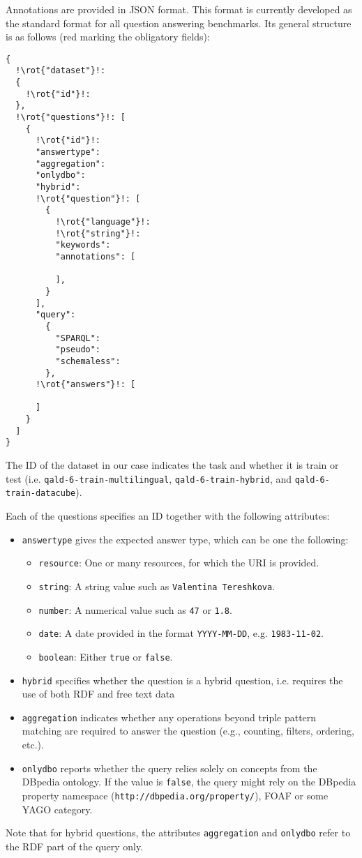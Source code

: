 
Annotations are provided in JSON format. This format is currently developed as the standard format for all question answering benchmarks.
Its general structure is as follows (red marking the obligatory fields):

\begin{lstlisting}[escapechar=!]
{
  !\rot{"dataset"}!:
  {
    !\rot{"id"}!:
  },
  !\rot{"questions"}!: [
    {
      !\rot{"id"}!:
      "answertype":
      "aggregation":
      "onlydbo":
      "hybrid":
      !\rot{"question"}!: [
        {
          !\rot{"language"}!:
          !\rot{"string"}!:
          "keywords":
          "annotations": [

          ],
        }
      ],
      "query":
        {
          "SPARQL":
          "pseudo":
          "schemaless":
        },
      !\rot{"answers"}!: [

      ]
    }
  ]
}
\end{lstlisting}

The ID of the dataset in our case indicates the task and whether it is train or test (i.e. {\tt qald-6-train-multilingual}, {\tt qald-6-train-hybrid}, and {\tt qald-6-train-datacube}).

Each of the questions specifies an ID together with the following attributes:
\begin{itemize}
\item {\tt answertype} gives the expected answer type, which can be one the following:
\begin{itemize}
\item {\tt resource}: One or many resources, for which the URI is provided.
\item {\tt string}: A string value such as {\tt Valentina Tereshkova}.
\item {\tt number}: A numerical value such as {\tt 47} or {\tt 1.8}.
\item {\tt date}: A date provided in the format {\tt YYYY-MM-DD}, e.g. {\tt 1983-11-02}.
\item {\tt boolean}: Either {\tt true} or {\tt false}.
\end{itemize}
\item {\tt hybrid} specifies whether the question is a hybrid question, i.e. requires the use of both RDF and free text data
\item {\tt aggregation} indicates whether any operations beyond triple pattern matching are required to answer the question (e.g., counting, filters, ordering, etc.).
\item {\tt onlydbo} reports whether the query relies solely on concepts from the DBpedia ontology. If the value is {\tt false}, the query might rely on
the DBpedia property namespace (\texttt{http://dbpedia.org/property/}), FOAF or some YAGO category.
\end{itemize}
Note that for hybrid questions, the attributes {\tt aggregation} and {\tt onlydbo} refer to the RDF part of the query only.

